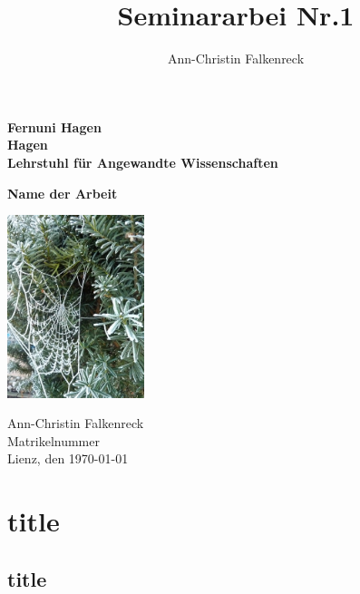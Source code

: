 \documentclass[ngerman,12pt,parskip=half]{scrreprt}
\author{Ann-Christin Falkenreck}
\title{Seminararbei Nr.1}
\begin{document}
	\begin{titlepage}
		
		{\large\textbf{Fernuni Hagen \\ Hagen \\ Lehrstuhl für Angewandte Wissenschaften}}
		
		\vspace*{4cm}
		
		{\bfseries\huge Name der Arbeit}
		
		\begin{center}
			\includegraphics[width=4cm]{Bilder/Herbst}
		\end{center}
		
		\vfill
		Ann-Christin Falkenreck\\
		Matrikelnummer \\
		Lienz, den \today
		
	\end{titlepage}
	
	
	\tableofcontents
	\listoffigures
	\listoftables
	
	\chapter{title}
	\section{title}
	
	
	
\end{document}
